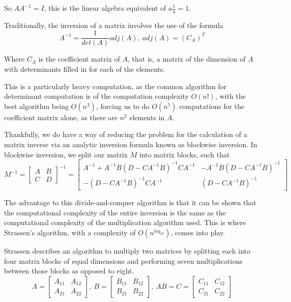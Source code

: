 \documentclass[12pt, letterpaper]{article}
\theoremstyle{remark}
\theoremstyle{remark}
\begin{document}
    So \(AA^{-1} = I\), this is the linear algebra equivalent of \(a\frac{1}{a} = 1\).

    \bigskip

    Traditionally, the inversion of a matrix involves the use of the formula
    \[A^{-1} = \frac{1}{det(A)}adj(A),\ adj(A) = (C_{A})^T\]

    Where \(C_A\) is the coefficient matrix of \(A\), that is, a matrix of 
    the dimension of \(A\) with determinants filled in for each of the elements.

    This is a particularly heavy computation, as the common algorithm for determinant
    computation is of the computation complexity \(O(n!)\), with the best algorithm 
    being \(O(n^3)\), forcing us to do \(O(n^5)\) computations for the coefficient 
    matrix alone, as there are \(n^2\) elements in \(A\).

    \bigskip

    Thankfully, we do have a way of reducing the problem for the calculation of 
    a matrix inverse via an analytic inversion formula known as blockwise inversion\cite{zhang}. 
    In blockwise inversion, we split our matrix \(M\) into matrix blocks, such that
    \[M^{-1} = \begin{bmatrix*}
        A & B \\
        C & D
    \end{bmatrix*}^{-1} = 
    \begin{bmatrix*}
        A^{-1} + A^{-1}B(D - CA^{-1}B)^{-1}CA^{-1} & -A^{-1}B(D - CA^{-1}B)^{-1} \\
        -(D - CA^{-1}B)^{-1}CA^{-1} & (D - CA^{-1}B)^{-1}
    \end{bmatrix*}\]
    
    The advantage to this divide-and-conquer algorithm is that it can be shown 
    that the computational complexity of the entire inversion is the same as the
    computational complexity of the multiplication algorithm used\cite{algo}. This is where 
    Strassen's algorithm, with a complexity of \(O(n^{log_27})\), comes into play.

    \bigskip

    Strassen describes an algorithm to multiply two matrices by splitting
    each into four matrix blocks of equal dimensions and performing seven multiplications
    between those blocks as opposed to eight\cite{strassen}.
    \[A = \begin{bmatrix*}
        A_{11} & A_{12} \\
        A_{21} & A_{22}
    \end{bmatrix*},\ B =
    \begin{bmatrix*}
        B_{11} & B_{12} \\
        B_{21} & B_{22}
    \end{bmatrix*},\ AB = C =
    \begin{bmatrix*}
        C_{11} & C_{12} \\
        C_{21} & C_{22}
    \end{bmatrix*}\]
\end{document}
